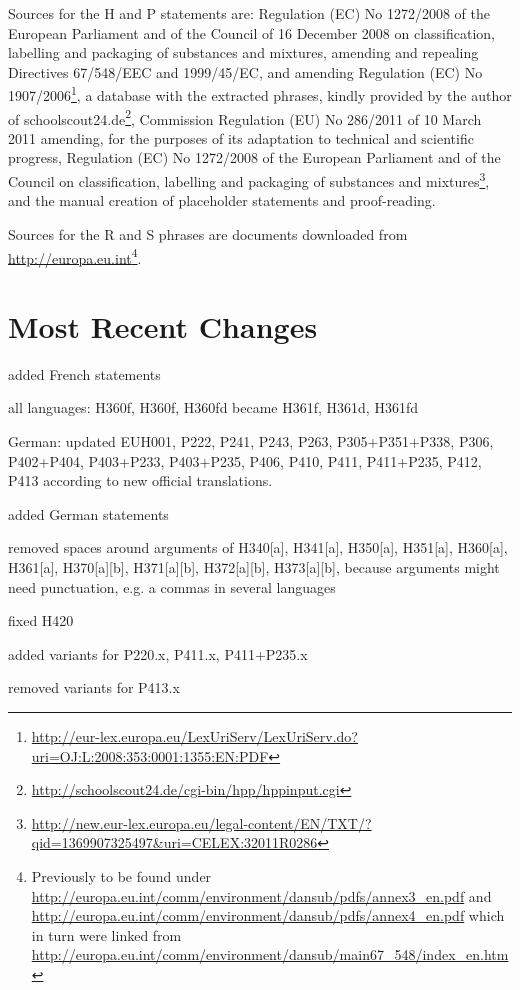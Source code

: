 \documentclass[a4paper,notitlepage,parskip=half]{scrreprt}
\newenvironment{annotation}{\bgroup\footnotesize}{\par\egroup}
\begin{document}
\begin{annotation}\RaggedRight Sources for the H and P statements are:
Regulation (EC) No 1272/2008 of the European Parliament and of the Council of 16
December 2008 on classification, labelling and packaging of substances and
mixtures, amending and repealing Directives 67/548/EEC and 1999/45/EC, and
amending Regulation (EC) No
1907/2006\footnote{\url{http://eur-lex.europa.eu/LexUriServ/LexUriServ.do?uri=OJ:L:2008:353:0001:1355:EN:PDF}},
a database with the extracted phrases, kindly provided by the author of
schoolscout24.de\footnote{\url{http://schoolscout24.de/cgi-bin/hpp/hppinput.cgi}},
Commission Regulation (EU) No 286/2011 of 10 March 2011 amending, for the
purposes of its adaptation to technical and scientific progress, Regulation (EC)
No 1272/2008 of the European Parliament and of the Council on classification,
labelling and packaging of substances and
mixtures\footnote{\url{http://new.eur-lex.europa.eu/legal-content/EN/TXT/?qid=1369907325497\&uri=CELEX:32011R0286}},
and the manual creation of placeholder statements and proof-reading.

Sources for the R and S phrases are documents downloaded from
\url{http://europa.eu.int}\footnote{Previously to be found under
\url{http://europa.eu.int/comm/environment/dansub/pdfs/annex3_en.pdf} and
\url{http://europa.eu.int/comm/environment/dansub/pdfs/annex4_en.pdf} which in
turn were linked from
\url{http://europa.eu.int/comm/environment/dansub/main67_548/index_en.htm}}.
\end{annotation}


\clearpage
\section{Most Recent Changes}%

\begin{compactitem}
  \item added French statements
  \item all languages: H360f, H360f, H360fd became H361f, H361d, H361fd
  \item German: updated EUH001, P222, P241, P243, P263, P305+P351+P338, P306, P402+P404, P403+P233, P403+P235, P406, P410, P411, P411+P235, P412, P413 according to new official translations.
\end{compactitem}

\begin{compactitem}
\item added German statements
\item removed spaces around arguments of H340[a], H341[a], H350[a], H351[a], 
  H360[a], H361[a], H370[a][b], H371[a][b], H372[a][b], H373[a][b], because 
  arguments might need punctuation, e.g. a commas in several languages
\item fixed H420
\item added variants for P220.x, P411.x, P411+P235.x
\item removed variants for P413.x
\end{compactitem}
\end{document}
